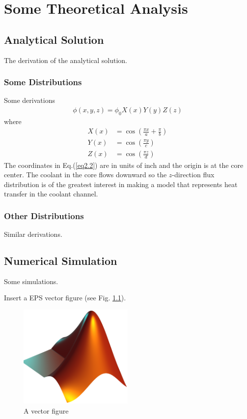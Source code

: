 \chapter{Some Theoretical Analysis}

\section{Analytical Solution} \label{sec:2.1}
The derivation of the analytical solution.

\subsection{Some Distributions}
Some derivations
\begin{align}
    \phi(x,y,z) = \phi_0 X(x) Y(y) Z(z)
\end{align}
where
\begin{subequations}
    \label{eq2.2}
    \begin{align}
        X(x) &= \cos \left(\frac{\pi x}{a}+\frac{\pi}{b}\right) \\
        Y(x) &= \cos \left(\frac{\pi y}{c}\right) \\
        Z(x) &= \cos \left(\frac{\pi z}{d}\right)         
    \end{align}
\end{subequations}
The coordinates in Eq.(\ref{eq2.2}) are in units of inch and the origin is at the core center.
The coolant in the core flows downward so the $z$-direction flux distribution is of the greatest 
interest in making a model that represents heat transfer in the coolant channel.

\subsection{Other Distributions}
Similar derivations.


\section{Numerical Simulation}

Some simulations.

Insert a EPS vector figure (see Fig. \ref{fig:eps_figure}).
\begin{figure}[!htbp]
    \centering
    \includegraphics[width=0.5\textwidth]{fig/matlab-logo.eps}
    \caption{A vector figure}
    \label{fig:eps_figure}
\end{figure}